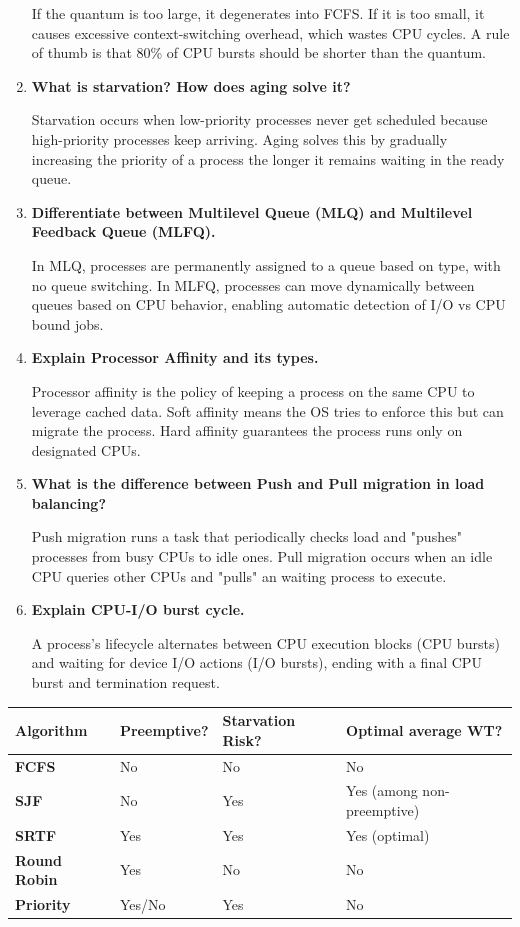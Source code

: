 \documentclass[12pt,a4paper]{article}
\newcommand{\Q}[1]{\textbf{#1}\par\noindent\ignorespaces}
\renewcommand{\arraystretch}{1.45}
\begin{document}
\begin{tcolorbox}[exambox, title={\textbf{Frequently Asked / Viva Questions}}]
\begin{enumerate}[topsep=0pt, label=\textbf{Q\arabic*.}, itemsep=5pt]
    If the quantum is too large, it degenerates into FCFS. If it is too small, it causes excessive context-switching overhead, which wastes CPU cycles. A rule of thumb is that 80\% of CPU bursts should be shorter than the quantum.
  \item \Q{What is starvation? How does aging solve it?}
    Starvation occurs when low-priority processes never get scheduled because high-priority processes keep arriving. Aging solves this by gradually increasing the priority of a process the longer it remains waiting in the ready queue.
  \item \Q{Differentiate between Multilevel Queue (MLQ) and Multilevel Feedback Queue (MLFQ).}
    In MLQ, processes are permanently assigned to a queue based on type, with no queue switching. In MLFQ, processes can move dynamically between queues based on CPU behavior, enabling automatic detection of I/O vs CPU bound jobs.
  \item \Q{Explain Processor Affinity and its types.}
    Processor affinity is the policy of keeping a process on the same CPU to leverage cached data. Soft affinity means the OS tries to enforce this but can migrate the process. Hard affinity guarantees the process runs only on designated CPUs.
  \item \Q{What is the difference between Push and Pull migration in load balancing?}
    Push migration runs a task that periodically checks load and "pushes" processes from busy CPUs to idle ones. Pull migration occurs when an idle CPU queries other CPUs and "pulls" an waiting process to execute.
  \item \Q{Explain CPU-I/O burst cycle.}
    A process's lifecycle alternates between CPU execution blocks (CPU bursts) and waiting for device I/O actions (I/O bursts), ending with a final CPU burst and termination request.
\end{enumerate}
\end{tcolorbox}

\begin{tcolorbox}[tikzbox, title={CPU Scheduling Algorithms Comparison}]
\renewcommand{\arraystretch}{1.4}
\par\noindent
\begin{tabularx}{\linewidth}{|B{2.2cm}|>{\small\centering\arraybackslash}X|>{\small\centering\arraybackslash}X|>{\small\centering\arraybackslash}X|}
\hline
\textbf{Algorithm} & \textbf{\color{myred}Preemptive?} & \textbf{\color{myteal}Starvation Risk?} & \textbf{\color{myamber}Optimal average WT?} \\
\hline
\textbf{FCFS} & No & No & No \\
\hline
\textbf{SJF} & No & Yes & Yes (among non-preemptive) \\
\hline
\textbf{SRTF} & Yes & Yes & Yes (optimal) \\
\hline
\textbf{Round Robin} & Yes & No & No \\
\hline
\textbf{Priority} & Yes/No & Yes & No \\
\hline
\end{tabularx}
\end{tcolorbox}
\end{document}
